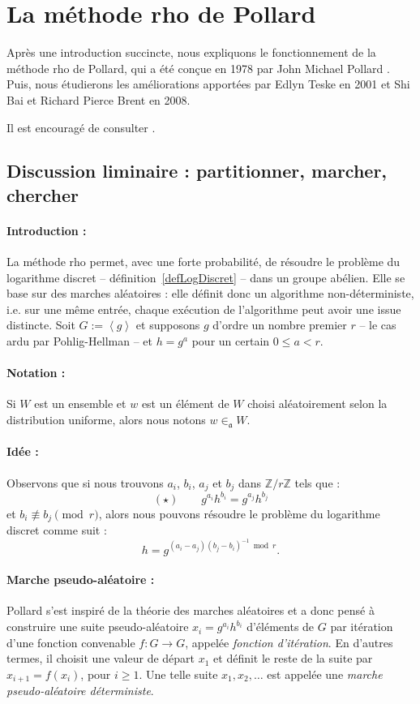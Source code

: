 \documentclass[a4paper, titlepage]{article}
\theoremstyle{definition}
\theoremstyle{remark}
\def\Z{\mathbb Z}
\def\gen #1{\left\langle#1\right\rangle}
\begin{document}
\section{La méthode rho de Pollard}

Après une introduction succincte, nous expliquons le fonctionnement de la méthode rho de Pollard, qui a été conçue en 1978 par John Michael Pollard \cite{pollard1978}. Puis, nous étudierons les améliorations apportées par Edlyn Teske \cite{teske2001} en 2001 et Shi Bai et Richard Pierce Brent \cite{bai2008} en 2008. 

Il est encouragé de consulter \cite[section 14, pp. 264]{galbraith2012}.

\subsection{Discussion liminaire : partitionner, marcher, chercher}

\paragraph*{Introduction :} La méthode rho permet, avec une forte probabilité, de résoudre le problème du logarithme discret -- définition~\ref{defLogDiscret} -- dans un groupe abélien. Elle se base sur des marches aléatoires : elle définit donc un algorithme non-déterministe, i.e. sur une même entrée, chaque exécution de l'algorithme peut avoir une issue distincte. Soit $G := \gen{g}$ et supposons $g$ d'ordre un nombre premier $r$ -- le cas ardu par Pohlig-Hellman -- et $h = g^a$ pour un certain $0 \leqslant a < r$. 

\paragraph*{Notation :} Si $W$ est un ensemble et $w$ est un élément de $W$ choisi aléatoirement selon la distribution uniforme, alors nous notons $w \in_{\mathfrak{a}} W$.

\paragraph*{Idée :} Observons que si nous trouvons $a_i$, $b_i$, $a_j$ et $b_j$ dans $\Z/r\Z$ tels que :
$$(\star) \qquad g^{a_i}h^{b_i} = g^{a_j}h^{b_j}$$
et $b_i \not\equiv b_j \pmod{r}$, alors nous pouvons résoudre le problème du logarithme discret comme suit : $$h = g^{(a_i-a_j)(b_j-b_i)^{-1}\bmod{r}}.$$

\paragraph*{Marche pseudo-aléatoire :} Pollard \cite{pollard1978} s'est inspiré de la théorie des marches aléatoires et a donc pensé à construire une suite pseudo-aléatoire $x_i = g^{a_i}h^{b_i}$ d'éléments de $G$ par itération d'une fonction convenable $f:G \rightarrow  G$, appelée \textit{fonction d'itération}. En d'autres termes, il choisit une valeur de départ $x_1$ et définit le reste de la suite par $x_{i+1}=f({x_i})$, pour $i \geqslant 1$. Une telle suite $x_1, x_2, \dots$ est appelée une \textit{marche pseudo-aléatoire déterministe}. 
\end{document}
